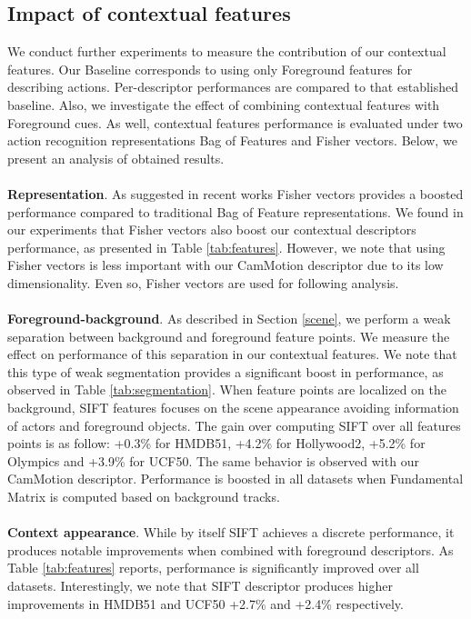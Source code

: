 \subsection{Impact of contextual features}
We conduct further experiments to measure the  contribution of our contextual features. Our Baseline corresponds to using only Foreground features for describing actions. Per-descriptor performances are compared to that established baseline. Also, we investigate the effect of combining contextual features with Foreground cues. As well, contextual features performance is evaluated under two action recognition representations \ie Bag of Features and Fisher vectors. Below, we present an analysis of obtained results.\\\\
\textbf{Representation}. As suggested in recent works \cite{perronnin2010, wang2013, xwang2013} Fisher vectors provides a boosted performance compared to traditional Bag of Feature representations. We found in our experiments that Fisher vectors also boost our contextual descriptors performance, as presented in Table \ref{tab:features}. However, we note that using Fisher vectors is less important with our CamMotion descriptor due to its low dimensionality. Even so, Fisher vectors are used for following analysis.\\\\
\textbf{Foreground-background}. As described in Section \ref{scene}, we perform a weak separation between background and foreground feature points. We measure the effect on performance of this separation in our contextual features. We note that this type of weak segmentation provides a significant boost in performance, as observed in Table \ref{tab:segmentation}. When feature points are localized on the background, SIFT features focuses on the scene appearance avoiding information of actors and foreground objects. The gain over computing SIFT over all features points is as follow: +0.3\% for HMDB51, +4.2\% for Hollywood2, +5.2\% for Olympics and +3.9\% for UCF50. The same behavior is observed with our CamMotion descriptor. Performance is boosted in all datasets when Fundamental Matrix is computed based on background tracks.\\\\
\textbf{Context appearance}. While by itself SIFT achieves a discrete performance, it produces notable improvements when combined with foreground descriptors. As Table \ref{tab:features} reports, performance is significantly improved over all datasets. Interestingly, we note that SIFT descriptor produces higher improvements in HMDB51 and UCF50 \ie +2.7\% and +2.4\% respectively.\\\\
